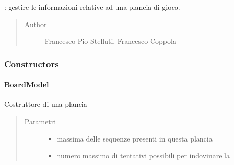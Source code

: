 \documentclass[letterpaper,10pt,italian,openany,oneside]{sphinxmanual}
\begin{document}
\begin{fulllineitems}
\label{\detokenize{source/it/unicam/cs/pa/mastermind/gamecore/BoardModel:it.unicam.cs.pa.mastermind.gamecore.BoardModel}}
: gestire le informazioni relative ad una plancia di gioco.
\begin{quote}\begin{description}
\item[{Author}] \leavevmode
Francesco Pio Stelluti, Francesco Coppola

\end{description}\end{quote}

\end{fulllineitems}



\subsubsection{Constructors}
\label{\detokenize{source/it/unicam/cs/pa/mastermind/gamecore/BoardModel:constructors}}

\paragraph{BoardModel}
\label{\detokenize{source/it/unicam/cs/pa/mastermind/gamecore/BoardModel:id1}}

\begin{fulllineitems}
\label{\detokenize{source/it/unicam/cs/pa/mastermind/gamecore/BoardModel:it.unicam.cs.pa.mastermind.gamecore.BoardModel.BoardModel(int, int)}}
Costruttore di una plancia
\begin{quote}\begin{description}
\item[{Parametri}] \leavevmode\begin{itemize}
\item {} 
 \textendash{} massima delle sequenze presenti in questa plancia

\item {} 
 \textendash{} numero massimo di tentativi possibili per indovinare la 

\end{itemize}

\end{description}\end{quote}

\end{fulllineitems}
\end{document}
